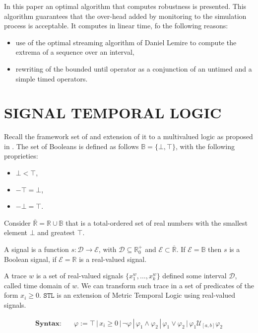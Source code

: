 \documentclass{suftesi}
\newcommand{\STL}{$\mathtt{STL}$ }
\begin{document}
In this paper an optimal algorithm that computes robustness is presented. This algorithm guarantees that the over-head added by monitoring to the simulation process is acceptable. It computes in linear time, fo  the following reasons:
\begin{itemize}[leftmargin=0.5cm]
    \item use of the optimal streaming algorithm of Daniel Lemire to compute the extrema of a sequence over an interval,
    \item rewriting of the bounded until operator as a conjunction of an untimed and a simple timed operators.
\end{itemize}

\section{SIGNAL TEMPORAL LOGIC}
Recall the framework set of \cite{maler2004}  and extension of it to a multivalued logic as proposed in \cite{fainekos2009}. The set of Booleans is defined as follows $\mathbb{B}=\{\bot,\top\}$, with the following proprieties:
\begin{itemize}[leftmargin=0.5cm]
    \item $\bot<\top$,
    \item $-\top=\bot$,
    \item $-\bot=\top$.
\end{itemize}

Consider $\overline{\mathbb{R}}=\mathbb{R}\cup\mathbb{B}$ that is a total-ordered set of real numbers with the smallest element $\bot$ and greatest $\top$. 

A signal is a function $s:\mathcal{D}\to\mathcal{E}$, with $\mathcal{D}\subseteq\mathbb{R}^+_0$ and $\mathcal{E}\subset\overline{\mathbb{R}}$. If $\mathcal{E}=\mathbb{B}$ then $s$ is a Boolean signal, if $\mathcal{E}=\mathbb{R}$ is a real-valued signal. 

A trace $w$ is a set of real-valued signals $\{x_1^w, \dots, x_k^w\}$ defined some interval $\mathcal{D}$, called time domain of $w$. We can transform such trace in a set of predicates of the form $x_i\geq 0$. \STL is an extension of Metric Temporal Logic using real-valued signals. 

\begin{align*}
    \textbf{Syntax:}    &\quad\varphi:=\top\,|\,x_i\geq0\,|\,\lnot\varphi\,|\,\varphi_1\land\varphi_2\,|\,\varphi_1\lor\varphi_2\,|\,\varphi_1\mathcal{U}_{[a,b]}\varphi_2
\end{align*}
\end{document}
